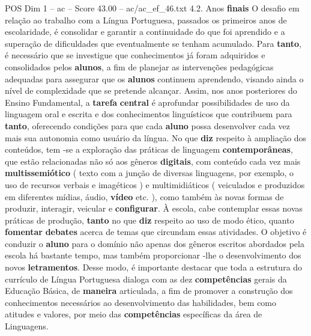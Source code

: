 \begin{textsample}{POS Dim 1 – ac – Score 43.00 – ac/ac\_ef\_46.txt}  \label{ex:f1_pos_180}
4.2.
Anos \textbf{finais} O desafio em relação ao trabalho com a Língua Portuguesa, passados os primeiros anos de escolaridade, é consolidar e garantir a continuidade do que foi aprendido e a superação de dificuldades que eventualmente se tenham acumulado.
Para \textbf{tanto}, é necessário que se investigue que conhecimentos já foram adquiridos e consolidados pelos \textbf{alunos}, a fim de planejar as intervenções pedagógicas adequadas para assegurar que os \textbf{alunos} continuem aprendendo, visando ainda o nível de complexidade que se pretende alcançar.
Assim, nos anos posteriores do Ensino Fundamental, a \textbf{tarefa} \textbf{central} é aprofundar possibilidades de uso da linguagem oral e escrita e dos conhecimentos linguísticos que contribuem para \textbf{tanto}, oferecendo condições para que cada \textbf{aluno} possa desenvolver cada vez mais sua autonomia como usuário da língua.
No que \textbf{diz} respeito à ampliação dos conteúdos, tem -se a exploração das práticas de linguagem \textbf{contemporâneas}, que estão relacionadas não só aos gêneros \textbf{digitais}, com conteúdo cada vez mais \textbf{multissemiótico} ( texto com a junção de diversas linguagens, por exemplo, o uso de recursos verbais e imagéticos ) e multimidiáticos ( veiculados e produzidos em diferentes mídias, áudio, \textbf{vídeo} etc. ), como também às novas formas de produzir, interagir, veicular e \textbf{configurar}.
À escola, cabe contemplar essas novas práticas de produção, \textbf{tanto} no que \textbf{diz} respeito ao uso de modo ético, quanto \textbf{fomentar} \textbf{debates} acerca de temas que circundam essas atividades.
O objetivo é conduzir o \textbf{aluno} para o domínio não apenas dos gêneros escritos abordados pela escola há bastante tempo, mas também proporcionar -lhe o desenvolvimento dos novos \textbf{letramentos}.
Desse modo, é importante destacar que toda a estrutura do currículo de Língua Portuguesa dialoga com as dez \textbf{competências} gerais da Educação Básica, de \textbf{maneira} articulada, a fim de promover a construção dos conhecimentos necessários ao desenvolvimento das habilidades, bem como atitudes e valores, por meio das \textbf{competências} específicas da área de Linguagens.

\end{textsample}
